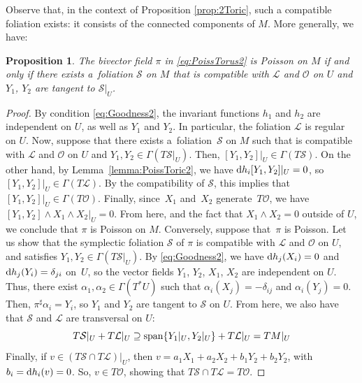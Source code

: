 \documentclass[pdftex]{sigma}%
\newcommand{\dd}{{\rm d}}
\numberwithin{equation}{section}
\newtheorem{Proposition}[Theorem]{Proposition}
 { \theoremstyle{definition}
\newtheorem{Definition}[Theorem]{Definition}
\newtheorem{Note}[Theorem]{Note}
\newtheorem{Example}[Theorem]{Example}
\newtheorem{Remark}[Theorem]{Remark} }
\begin{document}
Observe that, in the context of Proposition \ref{prop:2Toric}, such a compatible foliation exists: it consists of the connected components of $M$. More generally, we have:

\begin{Proposition}\label{prop:PoissTorus}
The bivector field $\pi$ in \eqref{eq:PoissTorus2} is Poisson on $M$ if and only if there exists a~foli\-a\-tion $\mathcal{S}$ on $M$ that is compatible with $\mathcal{L}$ and $\mathcal{O}$ on $U$ and $Y_1$, $Y_2$ are tangent to $\mathcal{S}|_{U}$.
\end{Proposition}
\begin{proof}
By condition \eqref{eq:Goodness2}, the invariant functions $h_1$ and $h_2$ are independent on $U$, as well as $Y_1$ and $Y_2$. In particular, the foliation $\mathcal{L}$ is regular on $U$. Now, suppose that there exists a~foliation~$\mathcal{S}$ on $M$ such that is compatible with $\mathcal{L}$ and $\mathcal{O}$ on $U$ and $Y_1,Y_2 \in \Gamma(T\mathcal{S}|_{U})$. Then, $[Y_1,Y_2]|_{U} \in \Gamma(T\mathcal{S})$. On the other hand, by Lemma~\ref{lemma:PoissToric2}, we have $\dd h_{i}[Y_1,Y_2]|_{U} = 0$, so $[Y_1,Y_2]|_{U} \in \Gamma(T\mathcal{L})$. By the compatibility of $\mathcal{S}$, this implies that $[Y_1,Y_2]|_{U} \in \Gamma(T\mathcal{O})$. Finally, since~$X_1$ and~$X_2$ generate~$T\mathcal{O}$, we have $[Y_1,Y_2] \wedge X_1 \wedge X_2|_{U} = 0$. From here, and the fact that $X_1 \wedge X_2 = 0$ outside of $U$, we conclude that $\pi$ is Poisson on $M$. Conversely, suppose that~$\pi$ is Poisson. Let us show that the symplectic foliation $\mathcal{S}$ of $\pi$ is compatible with $\mathcal{L}$ and $\mathcal{O}$ on $U$, and satisfies $Y_1,Y_2 \in \Gamma(T\mathcal{S}|_{U})$. By \eqref{eq:Goodness2}, we have $\dd h_{j}(X_i) = 0$ and $\dd h_{j}(Y_i) = \delta_{ji}$ on~$U$, so the vector fields $Y_1$, $Y_2$, $X_1$, $X_2$ are independent on $U$. Thus, there exist $\alpha_1,\alpha_2 \in \Gamma(T^{*}U)$ such that $\alpha_{i}(X_{j}) = -\delta_{ij}$ and $\alpha_{i}(Y_{j}) = 0$. Then, $\pi^{\sharp}\alpha_{i} = Y_{i}$, so $Y_1$ and $Y_2$ are tangent to $\mathcal{S}$ on $U$. From here, we also have that $\mathcal{S}$ and $\mathcal{L}$ are transversal on $U$:
 \begin{equation*}
 T\mathcal{S}|_{U}+T\mathcal{L}|_{U} \supseteq {\rm span}\{Y_1|_{U},Y_2|_{U}\} + T\mathcal{L}|_{U} = TM|_{U}
 \end{equation*}
Finally, if $v \in (T\mathcal{S} \cap T\mathcal{L})|_U$, then $v = a_1 X_1+a_2X_2 + b_1Y_2+b_2Y_2$, with $b_{i} = \dd h_{i}(v) = 0$. So, $v \in T\mathcal{O}$, showing that $T\mathcal{S} \cap T\mathcal{L}=T\mathcal{O}$.
\end{proof}
\end{document}
